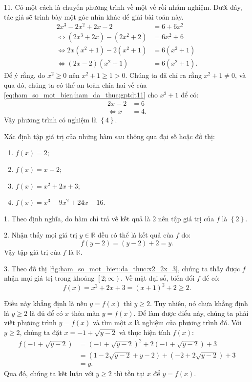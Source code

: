 11. Có một cách là chuyển phương trình về một vế rồi nhẩm nghiệm. Dưới đây, tác giả sẽ trình bày một góc nhìn khác để giải bài toán này.
\begin{align}
   2x^3 - 2x^2 + 2x - 2 &= 6 + 6x^2 \nonumber\\
   \iff \left(2x^3 + 2x\right) - \left(2x^2 + 2\right) &= 6x^2 + 6 \nonumber\\
   \iff 2x\left(x^2 + 1\right) - 2\left(x^2 + 1\right) &= 6\left(x^2 + 1\right) \nonumber\\
   \iff \left(2x - 2\right)\left(x^2 + 1\right) &= 6\left(x^2 + 1\right). \label{eq:ham_so_mot_bien:ham_da_thuc:gptdt11}
\end{align}
Để ý rằng, do $x^2 \geq 0$ nên $x^2 + 1 \geq 1 > 0$. Chúng ta đã chỉ ra rằng $x^2 + 1 \neq 0$, và qua đó, chúng ta có thể an toàn chia hai vế của \ref{eq:ham_so_mot_bien:ham_da_thuc:gptdt11} cho $x^2 + 1$ để có:
\begin{align*}
   2x - 2 &= 6 \\
   \iff x &= 4.
\end{align*}
Vậy phương trình có nghiệm là $\boxed{\displaystyle\left\{4\right\}}$.

\exercise Xác định tập giá trị của những hàm sau thông qua đại số hoặc đồ thị:
\begin{multicols}{2}
   \begin{enumerate}
      \item $f(x) = 2$;
      \item $f(x) = x + 2$;
      \item $f(x) = x^2 + 2x + 3$;
      \item $f(x) = x^3 - 9x^2 + 24x - 16$.
   \end{enumerate}
\end{multicols}
\solution

1. Theo định nghĩa, do hàm chỉ trả về kết quả là $2$ nên tập giá trị của $f$ là $\boxed{\left\{2\right\}}$.

2. Nhận thấy mọi giá trị $y \in \mathbb{R}$ đều có thể là kết quả của $f$ do:
$$f(y - 2) = (y - 2) + 2 = y.$$
Vậy tập giá trị của $f$ là $\boxed{\mathbb{R}}$.

3. Theo đồ thị \ref{fig:ham_so_mot_bien:da_thuc:x2_2x_3}, chúng ta thấy được $f$ nhận mọi giá trị trong khoảng $\left[2; \infty\right)$. Về mặt đại số, biến đổi $f$ để có:
$$f(x) = x^2 + 2x + 3 = (x + 1)^2 + 2 \geq 2.$$

Điều này khẳng định là nếu $y = f(x)$ thì $y \geq 2$. Tuy nhiên, nó chưa khẳng định là $y \geq 2$ là đủ để có $x$ thỏa mãn $y = f(x)$. Để làm được điểu này, chúng ta phải viết phương trình $y = f(x)$ và tìm một $x$ là nghiệm của phương trình đó. Với $y\geq 2$, chúng ta đặt $x = -1 + \sqrt{y - 2}$ và thực hiện tính $f(x)$:
\begin{align*}
   f\left(-1 + \sqrt{y - 2}\right) &= \left(-1 + \sqrt{y - 2}\right)^2 + 2\left(-1 + \sqrt{y - 2}\right) + 3 \\
   &= \left(1 - 2\sqrt{y - 2} + y - 2\right) + \left(- 2 + 2\sqrt{y - 2}\right) + 3 \\
   &= y.
\end{align*}
Qua đó, chúng ta kết luận với $y \geq 2$ thì tồn tại $x$ để $y = f(x)$.

